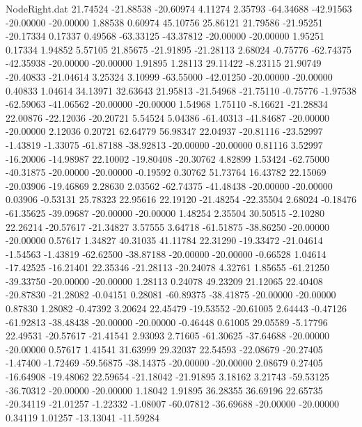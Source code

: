 \begin{filecontents}{NodeRight.dat}
  21.74524  -21.88538  -20.60974     4.11274    2.35793  -64.34688  -42.91563  -20.00000  -20.00000    1.88538    0.60974   45.10756   25.86121
  21.79586  -21.95251  -20.17334     0.17337    0.49568  -63.33125  -43.37812  -20.00000  -20.00000    1.95251    0.17334    1.94852    5.57105
  21.85675  -21.91895  -21.28113     2.68024   -0.75776  -62.74375  -42.35938  -20.00000  -20.00000    1.91895    1.28113   29.11422   -8.23115
  21.90749  -20.40833  -21.04614     3.25324    3.10999  -63.55000  -42.01250  -20.00000  -20.00000    0.40833    1.04614   34.13971   32.63643
  21.95813  -21.54968  -21.75110    -0.75776   -1.97538  -62.59063  -41.06562  -20.00000  -20.00000    1.54968    1.75110   -8.16621  -21.28834
  22.00876  -22.12036  -20.20721     5.54524    5.04386  -61.40313  -41.84687  -20.00000  -20.00000    2.12036    0.20721   62.64779   56.98347
  22.04937  -20.81116  -23.52997    -1.43819   -1.33075  -61.87188  -38.92813  -20.00000  -20.00000    0.81116    3.52997  -16.20006  -14.98987
  22.10002  -19.80408  -20.30762     4.82899    1.53424  -62.75000  -40.31875  -20.00000  -20.00000   -0.19592    0.30762   51.73764   16.43782
  22.15069  -20.03906  -19.46869     2.28630    2.03562  -62.74375  -41.48438  -20.00000  -20.00000    0.03906   -0.53131   25.78323   22.95616
  22.19120  -21.48254  -22.35504     2.68024   -0.18476  -61.35625  -39.09687  -20.00000  -20.00000    1.48254    2.35504   30.50515   -2.10280
  22.26214  -20.57617  -21.34827     3.57555    3.64718  -61.51875  -38.86250  -20.00000  -20.00000    0.57617    1.34827   40.31035   41.11784
  22.31290  -19.33472  -21.04614    -1.54563   -1.43819  -62.62500  -38.87188  -20.00000  -20.00000   -0.66528    1.04614  -17.42525  -16.21401
  22.35346  -21.28113  -20.24078     4.32761    1.85655  -61.21250  -39.33750  -20.00000  -20.00000    1.28113    0.24078   49.23209   21.12065
  22.40408  -20.87830  -21.28082    -0.04151    0.28081  -60.89375  -38.41875  -20.00000  -20.00000    0.87830    1.28082   -0.47392    3.20624
  22.45479  -19.53552  -20.61005     2.64443   -0.47126  -61.92813  -38.48438  -20.00000  -20.00000   -0.46448    0.61005   29.05589   -5.17796
  22.49531  -20.57617  -21.41541     2.93093    2.71605  -61.30625  -37.64688  -20.00000  -20.00000    0.57617    1.41541   31.63999   29.32037
  22.54593  -22.08679  -20.27405    -1.47400   -1.72469  -59.56875  -38.14375  -20.00000  -20.00000    2.08679    0.27405  -16.64908  -19.48062
  22.59654  -21.18042  -21.91895     3.18162    3.21743  -59.53125  -36.70312  -20.00000  -20.00000    1.18042    1.91895   36.28355   36.69196
  22.65735  -20.34119  -21.01257    -1.22332   -1.08007  -60.07812  -36.69688  -20.00000  -20.00000    0.34119    1.01257  -13.13041  -11.59284

\end{filecontents}
